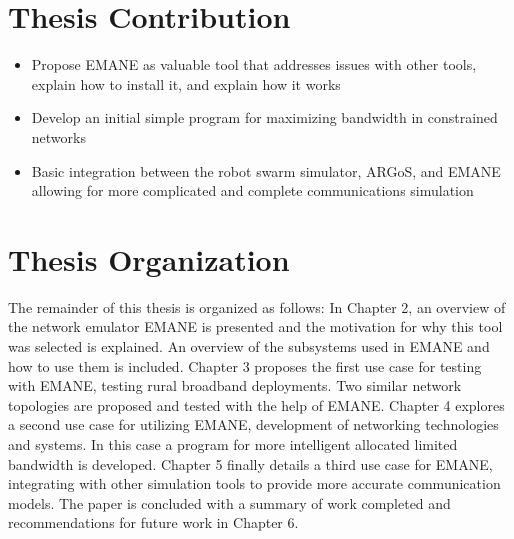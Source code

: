 \section{Thesis Contribution}
\begin{itemize}
    \item Propose EMANE as valuable tool that addresses issues with other tools, explain how to install it, and explain how it works
    \item Develop an initial simple program for maximizing bandwidth in constrained networks %
    \item Basic integration between the robot swarm simulator, ARGoS, and EMANE allowing for more complicated and complete communications simulation
\end{itemize}


\section{Thesis Organization}
The remainder of this thesis is organized as follows:
In Chapter 2, an overview of the network emulator EMANE is presented and the motivation for why this tool was selected is explained. An overview of the subsystems used in EMANE and how to use them is included.
Chapter 3 proposes the first use case for testing with EMANE, testing rural broadband deployments. Two similar network topologies are proposed and tested with the help of EMANE.
Chapter 4 explores a second use case for utilizing EMANE, development of networking technologies and systems. In this case a program for more intelligent allocated limited bandwidth is developed.
Chapter 5 finally details a third use case for EMANE, integrating with other simulation tools to provide more accurate communication models.
The paper is concluded with a summary of work completed and recommendations for future work in Chapter 6.
